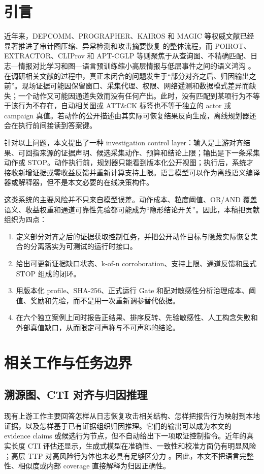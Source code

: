 \documentclass[conference,a4paper,10pt]{IEEEtran}
\begin{document}
\section{引言}
近年来，DEPCOMM、PROGRAPHER、KAIROS 和 MAGIC 等权威文献已经显著推进了审计图压缩、异常检测和攻击摘要恢复 \cite{ref1,ref2,ref3,ref4}的整体流程，而 POIROT、EXTRACTOR、CLIProv 和 APT-CGLP 等则聚焦于从查询图、不精确匹配、日志—情报对比学习和图—语言预训练缩小高层情报与低层事件之间的语义鸿沟 \cite{ref5,ref6,ref7,ref8}。在调研相关文献的过程中，真正未闭合的问题发生于“部分对齐之后、归因输出之前”。现场证据可能因保留窗口、采集代理、权限、网络遥测和数据模式差异而缺失；一个动作又可能因通道失效而没有任何产出。此时，没有匹配到某项行为不等于该行为不存在，自动相关图或 ATT\&CK 标签也不等于独立的 actor 或 campaign 真值。若动作的公开描述由其实际可恢复结果反向生成，离线规划器还会在执行前间接读到答案键。

针对以上问题，本文提出了一种 investigation control layer：输入是上游对齐结果、可回指来源的证据声明、候选采集动作、预算和结论上限；输出是下一条采集动作或 STOP。动作执行前，规划器只能看到版本化公开视图；执行后，系统才接收新增证据或零收益反馈并重新计算支持上限。语言模型可以作为离线语义编译器或解释器，但不是本文必要的在线决策构件。

这类系统的主要风险并不只来自模型误差。动作成本、粒度阈值、OR/AND 覆盖语义、收益权重和通道可靠性先验都可能成为“隐形结论开关”。因此，本稿把贡献组织为四点：

\begin{enumerate}[leftmargin=*,label=(\arabic*)]
  \item 定义部分对齐之后的证据获取控制任务，并把公开动作目标与隐藏实际恢复集合的分离落实为可测试的运行时接口。
  \item 给出可更新证据缺口状态、k-of-n corroboration、支持上限、通道反馈和显式 STOP 组成的闭环。
  \item 用版本化 profile、SHA-256、正式运行 Gate 和配对敏感性分析治理成本、阈值、奖励和先验，而不是用一次重新调参替代依据。
  \item 在六个独立案例上同时报告正结果、排序反转、先验敏感性、人工构念失败和外部真值缺口，从而限定可声称与不可声称的结论。
\end{enumerate}

\section{相关工作与任务边界}
\subsection{溯源图、CTI 对齐与归因推理}
现有上游工作主要回答怎样从日志恢复攻击相关结构、怎样把报告行为映射到本地证据，以及怎样基于已有证据组织归因推理。它们的输出可以成为本文的 evidence claims 或候选行为节点，但不自动给出下一项取证控制指令。近年的真实长度 CTI 评估还显示，生成式模型在准确性、一致性和校准方面仍有明显风险 \cite{ref9}；高层 TTP 对高风险行为体也未必具有足够区分力 \cite{ref10}。因此，本文不把语言完整性、相似度或内部 coverage 直接解释为归因正确性。
\end{document}
